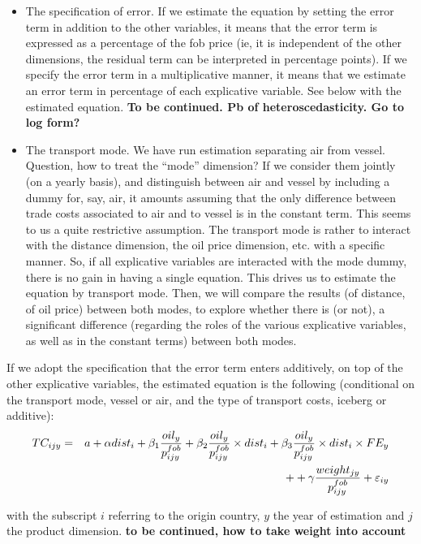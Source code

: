 \documentclass[a4paper,11pt]{article}
\begin{document}
\begin{itemize}
\item The specification of error. If we estimate the equation by setting the error term in addition to the other variables, it means that the error term is expressed as a percentage of the fob price (ie, it is independent of the other dimensions, the residual term can be interpreted in percentage points). If we specify the error term in a multiplicative manner, it means that we estimate an error term in percentage of each explicative variable. See below with the estimated equation. \textbf{To be continued. Pb of heteroscedasticity. Go to log form?}

\item The transport mode. We have run estimation separating air from vessel. Question, how to treat the ``mode'' dimension? If we consider them jointly (on a yearly basis), and distinguish between air and vessel by including a dummy for, say, air, it amounts assuming that the only difference between trade costs associated to air and to vessel is in the constant term. This seems to us a quite restrictive assumption. The transport mode is rather to interact with the distance dimension, the oil price dimension, etc. with a specific manner. So, if all explicative variables are interacted with the mode dummy, there is no gain in having a single equation. This drives us to estimate the equation by transport mode. Then, we will compare the results (of distance, of oil price) between both modes, to explore whether there is (or not), a significant difference (regarding the roles of the various explicative variables, as well as in the constant terms) between both modes.

\end{itemize}

If we adopt the specification that the error term enters additively, on top of the other explicative variables, the estimated equation is the following (conditional on the transport mode, vessel or air, and the type of transport costs, iceberg or additive):
\begin{eqnarray}
TC_{ijy} &=& a + \alpha dist_{i}+ \beta_1\frac{oil_{y}}{p^{fob}_{ijy}} + \beta_2\frac{oil_{y}}{p^{fob}_{ijy}}\times dist_{i} + \beta_3\frac{oil_{y}}{p^{fob}_{ijy}}\times dist_{i}\times FE_y \notag \\
 &&+ + \gamma\frac{weight_{jy}}{p^{fob}_{ijy}} + \varepsilon_{iy} \label{eq:2dstage}
\end{eqnarray}

with the subscript $i$ referring to the origin country, $y$ the year of estimation and $j$ the product dimension. \textbf{to be continued, how to take weight into account}
\end{document}
